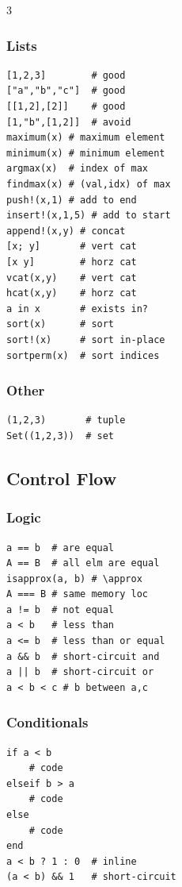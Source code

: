 \begin{multicols*}{3}
\subsubsection{Lists}
\vspace{-2mm}
\begin{verbatim}
[1,2,3]        # good
["a","b","c"]  # good
[[1,2],[2]]    # good
[1,"b",[1,2]]  # avoid 
maximum(x) # maximum element
minimum(x) # minimum element
argmax(x)  # index of max
findmax(x) # (val,idx) of max
push!(x,1) # add to end
insert!(x,1,5) # add to start
append!(x,y) # concat 
[x; y]       # vert cat
[x y]        # horz cat
vcat(x,y)    # vert cat
hcat(x,y)    # horz cat
a in x       # exists in?
sort(x)      # sort
sort!(x)     # sort in-place
sortperm(x)  # sort indices
\end{verbatim}


\subsubsection{Other}
\vspace{-2mm}
\begin{verbatim}
(1,2,3)       # tuple
Set((1,2,3))  # set
\end{verbatim}
    
\subsection{Control Flow}
\subsubsection{Logic}
\vspace*{-2mm}
\begin{verbatim}
a == b  # are equal
A == B  # all elm are equal
isapprox(a, b) # \approx
A === B # same memory loc
a != b  # not equal
a < b   # less than
a <= b  # less than or equal
a && b  # short-circuit and
a || b  # short-circuit or 
a < b < c # b between a,c
\end{verbatim}

\subsubsection{Conditionals}
\vspace*{-2mm}
\begin{verbatim}
if a < b
    # code
elseif b > a
    # code
else
    # code
end
a < b ? 1 : 0  # inline
(a < b) && 1   # short-circuit
\end{verbatim}


\end{multicols*}
